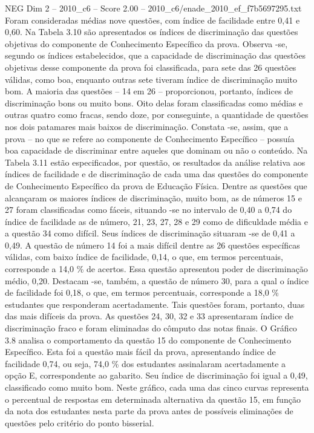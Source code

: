 \begin{textsample}{NEG Dim 2 – 2010\_c6 – Score 2.00 – 2010\_c6/enade\_2010\_ef\_f7b5697295.txt}
Foram consideradas médias nove questões, com índice de facilidade entre 0,41 e 0,60.
Na Tabela 3.10 são apresentados os índices de discriminação das questões objetivas do componente de Conhecimento Específico da prova.
Observa -se, segundo os índices estabelecidos, que a capacidade de discriminação das questões objetivas desse componente da prova foi classificada, para sete das 26 questões válidas, como boa, enquanto outras sete tiveram índice de discriminação muito bom.
A maioria das questões – 14 em 26 – proporcionou, portanto, índices de discriminação bons ou muito bons.
Oito delas foram classificadas como médias e outras quatro como fracas, sendo doze, por conseguinte, a quantidade de questões nos dois patamares mais baixos de discriminação.
Constata -se, assim, que a prova – no que se refere ao componente de Conhecimento Específico – possuía boa capacidade de discriminar entre aqueles que dominam ou não o conteúdo.
Na Tabela 3.11 estão especificados, por questão, os resultados da análise relativa aos índices de facilidade e de discriminação de cada uma das questões do componente de Conhecimento Específico da prova de Educação Física.
Dentre as questões que alcançaram os maiores índices de discriminação, muito bom, as de números 15 e 27 foram classificadas como fáceis, situando -se no intervalo de 0,40 a 0,74 do índice de facilidade as de número, 21, 23, 27, 28 e 29 como de dificuldade média e a questão 34 como difícil.
Seus índices de discriminação situaram -se de 0,41 a 0,49.
A questão de número 14 foi a mais difícil dentre as 26 questões específicas válidas, com baixo índice de facilidade, 0,14, o que, em termos percentuais, corresponde a 14,0 \% de acertos.
Essa questão apresentou poder de discriminação médio, 0,20.
Destacam -se, também, a questão de número 30, para a qual o índice de facilidade foi 0,18, o que, em termos percentuais, corresponde a 18,0 \% estudantes que responderam acertadamente.
Tais questões foram, portanto, duas das mais difíceis da prova.
As questões 24, 30, 32 e 33 apresentaram índice de discriminação fraco e foram eliminadas do cômputo das notas finais.
O Gráfico 3.8 analisa o comportamento da questão 15 do componente de Conhecimento Específico.
Esta foi a questão mais fácil da prova, apresentando índice de facilidade 0,74, ou seja, 74,0 \% dos estudantes assinalaram acertadamente a opção E, correspondente ao gabarito.
Seu índice de discriminação foi igual a 0,49, classificado como muito bom.
Neste gráfico, cada uma das cinco curvas representa o percentual de respostas em determinada alternativa da questão 15, em função da nota dos estudantes nesta parte da prova antes de possíveis eliminações de questões pelo critério do ponto bisserial.

\end{textsample}
